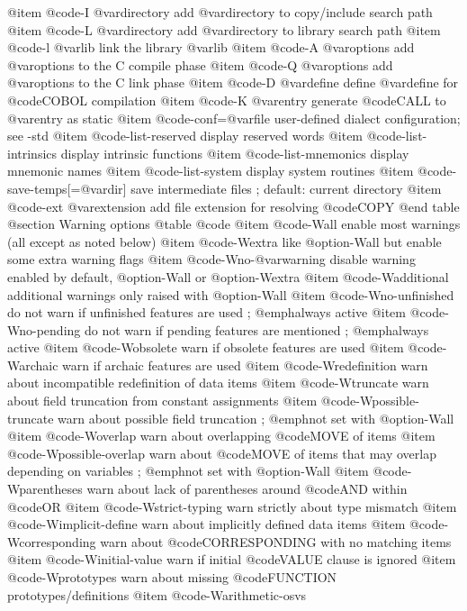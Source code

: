 @item @code{-I @var{directory}}
add @var{directory} to copy/include search path
@item @code{-L @var{directory}}
add @var{directory} to library search path
@item @code{-l @var{lib}}
link the library @var{lib}
@item @code{-A @var{options}}
add @var{options} to the C compile phase
@item @code{-Q @var{options}}
add @var{options} to the C link phase
@item @code{-D @var{define}}
define @var{define} for @code{COBOL} compilation
@item @code{-K @var{entry}}
generate @code{CALL} to @var{entry} as static
@item @code{-conf=@var{file}}
user-defined dialect configuration; see -std
@item @code{-list-reserved}
display reserved words
@item @code{-list-intrinsics}
display intrinsic functions
@item @code{-list-mnemonics}
display mnemonic names
@item @code{-list-system}
display system routines
@item @code{-save-temps[=@var{dir}]}
save intermediate files
; default: current directory
@item @code{-ext @var{extension}}
add file extension for resolving @code{COPY}
@end table
@section Warning options
@table @code
@item @code{-Wall}
enable most warnings (all except as noted below)
@item @code{-Wextra}
like @option{-Wall} but enable some extra warning flags
@item @code{-Wno-@var{warning}}
disable warning enabled by default, @option{-Wall} or @option{-Wextra}
@item @code{-Wadditional}
additional warnings only raised with @option{-Wall}
@item @code{-Wno-unfinished}
do not warn if unfinished features are used
; @emph{always active}
@item @code{-Wno-pending}
do not warn if pending features are mentioned
; @emph{always active}
@item @code{-Wobsolete}
warn if obsolete features are used
@item @code{-Warchaic}
warn if archaic features are used
@item @code{-Wredefinition}
warn about incompatible redefinition of data items
@item @code{-Wtruncate}
warn about field truncation from constant assignments
@item @code{-Wpossible-truncate}
warn about possible field truncation
; @emph{not set with @option{-Wall}}
@item @code{-Woverlap}
warn about overlapping @code{MOVE} of items
@item @code{-Wpossible-overlap}
warn about @code{MOVE} of items that may overlap depending on variables
; @emph{not set with @option{-Wall}}
@item @code{-Wparentheses}
warn about lack of parentheses around @code{AND} within @code{OR}
@item @code{-Wstrict-typing}
warn strictly about type mismatch
@item @code{-Wimplicit-define}
warn about implicitly defined data items
@item @code{-Wcorresponding}
warn about @code{CORRESPONDING} with no matching items
@item @code{-Winitial-value}
warn if initial @code{VALUE} clause is ignored
@item @code{-Wprototypes}
warn about missing @code{FUNCTION} prototypes/definitions
@item @code{-Warithmetic-osvs}
